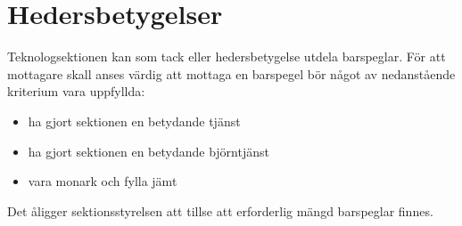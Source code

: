 \documentclass[a4paper]{dtek}
\begin{document}
\section{Hedersbetygelser}
\para[Allmänt] Teknologsektionen kan som tack eller hedersbetygelse utdela barspeglar.
\para[Kriterier] För att mottagare skall anses värdig att mottaga en barspegel bör något av nedanstående kriterium vara uppfyllda:
\begin{itemize}
\item ha gjort sektionen en betydande tjänst
\item ha gjort sektionen en betydande björntjänst
\item vara monark och fylla jämt
\end{itemize}
\para[Införskaffande] Det åligger sektionsstyrelsen att tillse att erforderlig mängd barspeglar finnes.
\end{document}
